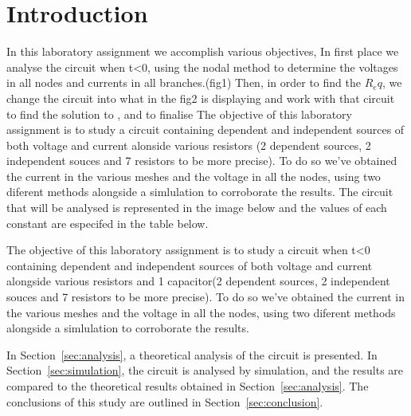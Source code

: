\newpage
\section{Introduction}
\label{sec:introduction}

In this laboratory assignment we accomplish various objectives,
In first place we analyse the circuit when t<0, using the nodal method to determine the voltages in all nodes and currents in all branches.(fig1) Then, in order to find the $R_eq$, we change the circuit into what in the fig2 is displaying and work with that circuit to
find the solution to , and to finalise
The objective of this laboratory assignment is to study a circuit containing dependent and independent sources of both voltage and current alonside various resistors (2 dependent sources, 2 independent souces and 7 resistors to be more precise). To do so we've obtained the current in the various meshes and the voltage in all the nodes, using two diferent methods alongside a simlulation to corroborate the results.
The circuit that will be analysed is represented in the image below and the values of each constant are especifed in the table below.

The objective of this laboratory assignment is to study a circuit when t<0 containing dependent and independent sources of both voltage and current alongside various resistors and 1 capacitor(2 dependent sources, 2 independent souces and 7 resistors to be more precise). To do so we've obtained the current in the various meshes and the voltage in all the nodes, using two diferent methods alongside a simlulation to corroborate the results.



In Section~\ref{sec:analysis}, a theoretical analysis of the circuit is
presented. In Section~\ref{sec:simulation}, the circuit is analysed by
simulation, and the results are compared to the theoretical results obtained in
Section~\ref{sec:analysis}. The conclusions of this study are outlined in
Section~\ref{sec:conclusion}. \\

\pagebreak
